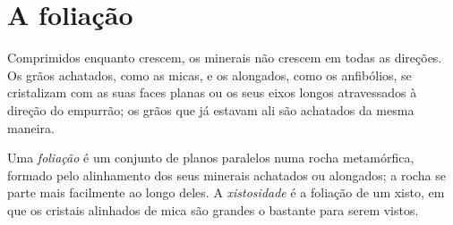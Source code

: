 \section{A foliação}\label{sec:g12:metamorphic-rocks:foliation}

Comprimidos enquanto crescem, os minerais não crescem em todas as direções.
Os grãos achatados, como as micas, e os alongados, como os anfibólios, se
cristalizam com as suas faces planas ou os seus eixos longos atravessados à
direção do empurrão; os grãos que já estavam ali são achatados da mesma
maneira.

\begin{definition}\label{def:g12:metamorphic-rocks:foliation}
Uma \emph{foliação} é um conjunto de planos
paralelos numa rocha metamórfica, formado pelo alinhamento dos seus minerais
achatados ou alongados; a rocha se parte mais facilmente ao longo deles. A
\emph{xistosidade} é a foliação de um xisto, em que os
cristais alinhados de mica são grandes o bastante para serem vistos.
\end{definition}

